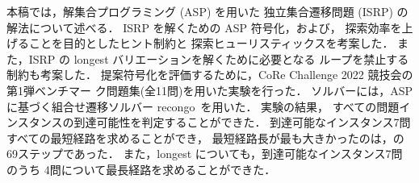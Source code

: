 
本稿では，解集合プログラミング (ASP) を用いた 独立集合遷移問題 (ISRP)
の解法について述べる．
ISRP を解くための ASP 符号化，および，
探索効率を上げることを目的としたヒント制約と
探索ヒューリスティックスを考案した．
また，ISRP の longest バリエーションを解くために必要となる
ループを禁止する制約も考案した．
%
提案符号化を評価するために，CoRe Challenge 2022 競技会の第1弾ベンチマー
ク問題集(全11問)を用いた実験を行った．
ソルバーには，ASPに基づく組合せ遷移ソルバー
\textsf{recongo}~\cite{Yamada21:jssst}を用いた．
実験の結果，
すべての問題インスタンスの到達可能性を判定することができた．
到達可能なインスタンス7問すべての最短経路を求めることができ，
最短経路長が最も大きかったのは，の69ステップであった．
また，longest についても，到達可能なインスタンス7問のうち
4問について最長経路を求めることができた．

